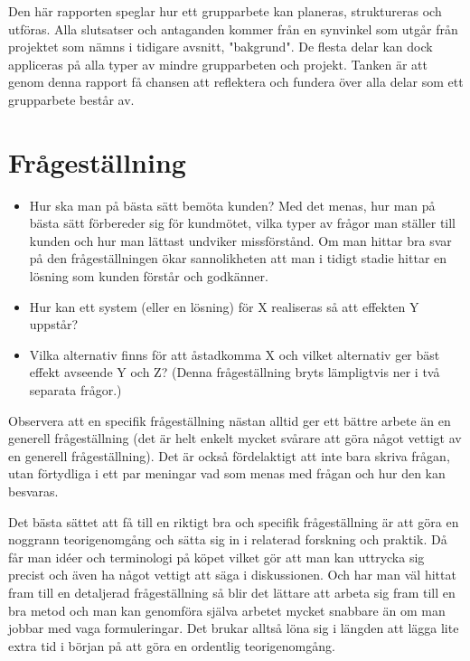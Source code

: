 \documentclass[a4paper,12pt,oneside,final]{extbook}
\begin{document}
Den här rapporten speglar hur ett grupparbete kan planeras, struktureras och utföras. Alla slutsatser och antaganden kommer från en synvinkel som utgår från projektet som nämns i tidigare avsnitt, "bakgrund". De flesta delar kan dock appliceras på alla typer av mindre grupparbeten och projekt. Tanken är att genom denna rapport få chansen att reflektera och fundera över alla delar som ett grupparbete består av.

\section{Frågeställning}

\begin{itemize}
\item Hur ska man på bästa sätt bemöta kunden? Med det menas, hur man på bästa sätt förbereder sig för kundmötet, vilka typer av frågor man ställer till kunden och hur man lättast undviker missförstånd. Om man hittar bra svar på den frågeställningen ökar sannolikheten att man i tidigt stadie hittar en lösning som kunden förstår och godkänner.  
\item Hur kan ett system (eller en lösning) för X realiseras så att
  effekten Y uppstår?
\item Vilka alternativ finns för att åstadkomma X och vilket
  alternativ ger bäst effekt avseende Y och Z?  (Denna frågeställning
  bryts lämpligtvis ner i två separata frågor.)
\end{itemize}

Observera att en specifik frågeställning nästan alltid ger ett bättre
arbete än en generell frågeställning (det är helt enkelt mycket
svårare att göra något vettigt av en generell frågeställning). Det är
också fördelaktigt att inte bara skriva frågan, utan förtydliga i ett
par meningar vad som menas med frågan och hur den kan besvaras.

Det bästa sättet att få till en riktigt bra och specifik
frågeställning är att göra en noggrann teorigenomgång och sätta sig in
i relaterad forskning och praktik. Då får man idéer och terminologi på
köpet vilket gör att man kan uttrycka sig precist och även ha något
vettigt att säga i diskussionen. Och har man väl hittat fram till en
detaljerad frågeställning så blir det lättare att arbeta sig fram till
en bra metod och man kan genomföra själva arbetet mycket snabbare än
om man jobbar med vaga formuleringar. Det brukar alltså löna sig i
längden att lägga lite extra tid i början på att göra en ordentlig
teorigenomgång.
\end{document}

